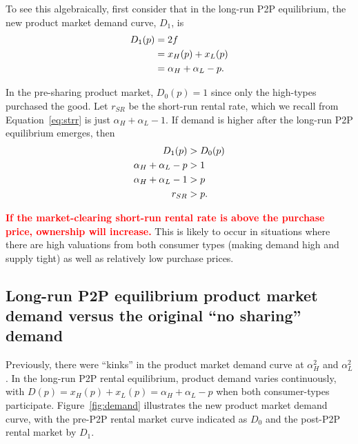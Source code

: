 \documentclass[11pt]{article}
\newcommand{\important}[1]{\textcolor{red}{\textbf{#1}}}
\newcommand{\important}[1]{#1}
\begin{document}
To see this algebraically, first consider that in the long-run P2P equilibrium, the new product market demand curve, $D_1$, is
\begin{align}
D_1(p) &= 2f \notag \\  
     &= x_H(p) + x_L(p) \notag \\ 
     &= \alpha_H + \alpha_L - p.  
\end{align} 

In the pre-sharing product market, $D_0(p) = 1$ since only the high-types purchased the good. 
Let $r_{SR}$ be the short-run rental rate, which we recall from Equation~\ref{eq:strr} is just $\alpha_H + \alpha_L - 1$. 
If demand is higher after the long-run P2P equilibrium emerges, then  
\begin{align} 
D_{1}(p) & > D_{0}(p) \notag \\
\alpha_H + \alpha_L - p &> 1 \notag \\ 
\alpha_H + \alpha_L - 1 &> p \notag \\ 
r_{SR} &>  p. 
\end{align} 

\important{If the market-clearing short-run rental rate is above the purchase price, ownership will increase.}
This is likely to occur in situations where there are high valuations from both consumer types (making demand high and supply tight) as well as relatively low purchase prices. 

\subsection{Long-run P2P equilibrium product market demand versus the original ``no sharing'' demand} 
Previously, there were ``kinks'' in the product market demand curve at $\alpha_H^2$ and $\alpha_L^2$. 
In the long-run P2P rental equilibrium, product demand varies continuously, with $D(p) = x_H(p) + x_L(p) = \alpha_H + \alpha_L - p$ when both consumer-types participate. 
Figure~\ref{fig:demand} illustrates the new product market demand curve, with the pre-P2P rental market curve indicated as $D_0$ and the post-P2P rental market by $D_1$. 
\end{document}
